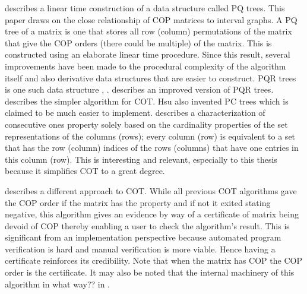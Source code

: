 \documentclass[MS,synopsis]{iitmdiss}
\begin{document}
\cite{bl76} describes a linear time construction of a data structure
called PQ trees. This paper draws on the close relationship of COP
matrices to interval graphs. A PQ tree of a matrix is one that stores
all row (column) permutations of the matrix that give the COP orders
(there could be multiple) of the matrix. This is constructed using an
elaborate linear time procedure. Since this result, several
improvements have been made to the procedural complexity of the
algorithm itself and also derivative data structures that are easier
to construct. PQR trees is one such data structure \cite{mm96},
\cite{mpt98}.
\cite{tm05} describes an improved version of PQR
trees. \cite{wlh02} describes the
simpler algorithm for COT. Hsu also invented PC trees
\cite{wlh01}
which is claimed to be much easier to implement. \cite{nsnrs09}
describes a characterization of consecutive ones property solely based
on the cardinality properties of the set representations of the
columns (rows); every column (row) is equivalent to a set that has the
row (column) indices of the rows (columns) that have one entries in
this column (row). This is interesting and relevant, especially to
this thesis because it simplifies COT to a great
degree. 

\cite{mcc04} describes a different approach to COT. While all previous
COT algorithms gave the COP order if the matrix has the property and
if not it exited stating negative, this algorithm gives an evidence by
way of a certificate of
matrix being devoid of COP thereby enabling a user to check the
algorithm's result. This is significant from an implementation
perspective because automated program verification is hard and manual
verification is more viable. Hence having a certificate
reinforces its credibility. Note that when the matrix has COP the COP
order is the certificate.  It may also be noted that the internal
machinery of this algorithm  {in what way??} in \cite{co98}.
\end{document}
